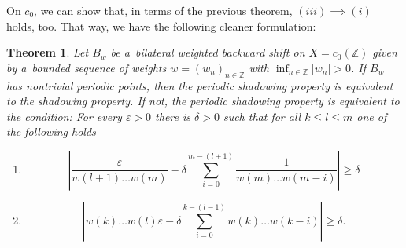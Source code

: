 \documentclass[11pt,a4paper]{amsart}
\newtheorem{theorem}{Theorem}[section]
\theoremstyle{definition}
\newcommand{\Z}{\mathbb{Z}}
\newcommand{\eps}{\varepsilon}
\newcommand{\abs}[1]{\left| #1 \right|}
\begin{document}
	On $c_0$, we can show that, in terms of the previous theorem, $(iii) \implies (i)$ holds, too. That way, we have the following cleaner formulation:
	
	\begin{theorem} \label{thm:PSPc0}
		Let $B_w$ be a~bilateral weighted backward shift on \(X = c_0(\Z)\) given by a~bounded sequence of weights \(w = (w_n)_{n \in \Z}\) with \(\inf_{n \in \Z}\abs{w_n} > 0\). If $B_w$ has nontrivial periodic points, then the periodic shadowing property is equivalent to the shadowing property. If not, the periodic shadowing property is equivalent to the condition:
		For every $\eps > 0$ there is $\delta > 0$ such that for all $k \leq l \leq m$ one of the following holds
		\begin{enumerate}
			\item[(a)] \begin{equation*}
				\abs{\frac{\varepsilon}{w(l+1)\dots w(m)}- \delta \sum_{i=0}^{m-(l+1)}\frac{1}{w(m) \dots w(m-i)}} \geq \delta
			\end{equation*}
			\item[(b)] \begin{equation*}
				\abs{w(k) \dots w(l)\varepsilon -\delta\sum_{i=0}^{k-(l-1)}w(k) \dots w(k-i)} \geq \delta.
			\end{equation*}
		\end{enumerate}
	\end{theorem}
\end{document}
